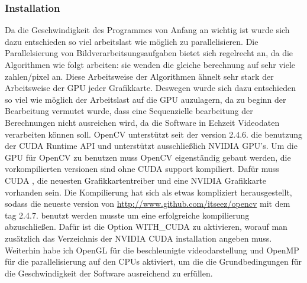 \subsubsection{Installation}
Da die Geschwindigkeit des Programmes von Anfang an wichtig ist wurde sich dazu entschieden so viel arbeitslast wie möglich zu parallelisieren. Die Parallelsierung von Bildverarbeitsungsaufgaben bietet sich regelrecht an, da die Algorithmen wie folgt arbeiten: sie wenden die gleiche berechnung auf sehr viele zahlen/pixel an. Diese Arbeitsweise der Algorithmen ähnelt sehr stark der Arbeitsweise der GPU jeder Grafikkarte. 
Deswegen wurde sich dazu entschieden so viel wie möglich der Arbeitslast auf die GPU auzulagern, da zu beginn der Bearbeitung vermutet wurde, dass eine Sequenzielle bearbeitung der Berechnungen nicht ausreichen wird, da die Software in Echzeit Videodaten verarbeiten können soll.
OpenCV unterstützt seit der version 2.4.6. die benutzung der CUDA Runtime API und unterstützt ausschlie\ss{}lich NVIDIA GPU's. Um die GPU für OpenCV zu benutzen muss OpenCV eigenständig gebaut werden, die vorkompilierten versionen sind ohne CUDA support kompiliert. Dafür muss CUDA , die neuesten Grafikkartentreiber und eine NVIDIA Grafikkarte vorhanden sein. 
Die Kompilierung hat sich als etwas kompliziert herausgestellt, sodass die neueste version von \url{http://www.github.com/itseez/opencv}  mit dem tag 2.4.7. benutzt werden musste um eine erfolgreiche kompilierung abzuschlie\ss{}en. Dafür ist die Option WITH\_CUDA zu aktivieren, worauf man zusätzlich das Verzeichnis der NVIDIA CUDA installation angeben muss. Weiterhin habe ich OpenGL für die beschleunigte videodarstellung und OpenMP für die parallelisierung auf den CPUs aktiviert, um die die Grundbedingungen für die Geschwindigkeit der Software ausreichend zu erfüllen.
